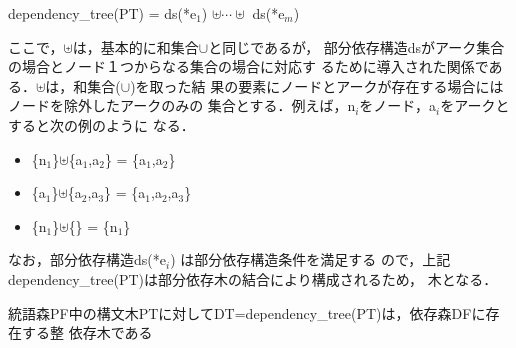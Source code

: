 \begin{definition}
  dependency\_tree(PT) = ds(*e$_1$) ${\uplus}{\cdots}{\uplus}$ ds(*e$_m$) 

\mynoindent ここで，${\uplus}$は，基本的に和集合${\cup}$と同じであるが，
部分依存構造dsがアーク集合の場合とノード１つからなる集合の場合に対応す
るために導入された関係である．${\uplus}$は，和集合(${\cup}$)を取った結
果の要素にノードとアークが存在する場合にはノードを除外したアークのみの
集合とする．例えば，n$_i$をノード，a$_i$をアークとすると次の例のように
なる．

\begin{itemize}
\item[] \{n$_1$\}${\uplus}$\{a$_1$,a$_2$\} = \{a$_1$,a$_2$\}
\item[] \{a$_1$\}${\uplus}$\{a$_2$,a$_3$\} = \{a$_1$,a$_2$,a$_3$\}
\item[] \{n$_1$\}${\uplus}$\{\} = \{n$_1$\}
\end{itemize}

\end{definition}

{\mynoindent}なお，部分依存構造ds(*e$_i$) は部分依存構造条件を満足する
ので，上記dependency\_tree(PT)は部分依存木の結合により構成されるため，
木となる．

\mytheorembeforegap
\begin{theorem}[依存森の完全性]
\label{the:CompletenessOfPF}
統語森PF中の構文木PTに対してDT=dependency\_tree(PT)は，依存森DFに存在する整
依存木である

\end{theorem}


